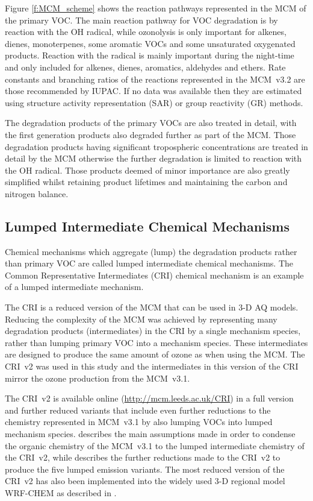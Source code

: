 Figure \ref{f:MCM_scheme} shows the reaction pathways represented in the MCM of the primary VOC.
The main reaction pathway for VOC degradation is by reaction with the OH radical, while ozonolysis is only important for alkenes, dienes, monoterpenes, some aromatic VOCs and some unsaturated oxygenated products. 
Reaction with the  radical is mainly important during the night-time and only included for alkenes, dienes, aromatics, aldehydes and ethers.
Rate constants and branching ratios of the reactions represented in the MCM~v3.2 are those recommended by IUPAC.
If no data was available then they are estimated using structure activity representation (SAR) or group reactivity (GR) methods.

The degradation products of the primary VOCs are also treated in detail, with the first generation products also degraded further as part of the MCM. 
Those degradation products having significant tropospheric concentrations are treated in detail by the MCM otherwise the further degradation is limited to reaction with the OH radical. 
Those products deemed of minor importance are also greatly simplified whilst retaining product lifetimes and maintaining the carbon and nitrogen balance. 

\subsection{Lumped Intermediate Chemical Mechanisms} \label{ss:lumped_intermediate}
Chemical mechanisms which aggregate (lump) the degradation products rather than primary VOC are called lumped intermediate chemical mechanisms.
The Common Representative Intermediates (CRI) chemical mechanism \citep{Jenkin:2008} is an example of a lumped intermediate mechanism.

The CRI is a reduced version of the MCM that can be used in 3-D AQ models.
Reducing the complexity of the MCM was achieved by representing many degradation products (intermediates) in the CRI by a single mechanism species, rather than lumping primary VOC into a mechanism species.
These intermediates are designed to produce the same amount of ozone as when using the MCM.
The CRI~v2 was used in this study and the intermediates in this version of the CRI mirror the ozone production from the MCM~v3.1.

The CRI~v2 is available online (\mbox{\url{http://mcm.leeds.ac.uk/CRI}}) in a full version and further reduced variants that include even further reductions to the chemistry represented in MCM~v3.1 by also lumping VOCs into lumped mechanism species.
\citet{Jenkin:2008} describes the main assumptions made in order to condense the organic chemistry of the MCM~v3.1 to the lumped intermediate chemistry of the CRI~v2, while \citet{Watson:2008} describes the further reductions made to the CRI~v2 to produce the five lumped emission variants.
The most reduced version of the CRI~v2 has also been implemented into the widely used 3-D regional model WRF-CHEM as described in \citet{Archer-Nicholls:2014}.

